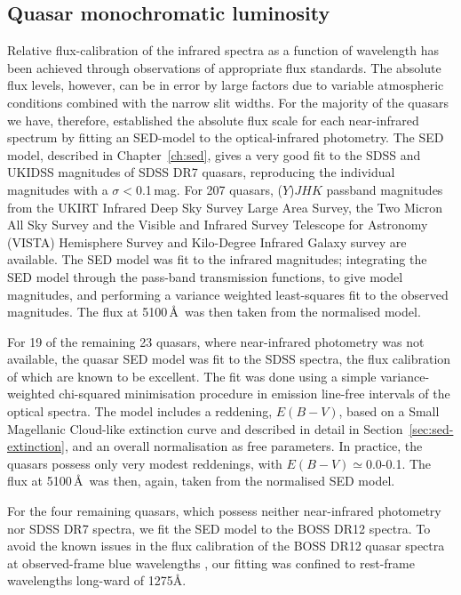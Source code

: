 \subsection{Quasar monochromatic luminosity}

Relative flux-calibration of the infrared spectra as a function of wavelength has been achieved through observations of appropriate flux standards. 
The absolute flux levels, however, can be in error by large factors due to variable atmospheric conditions combined with the narrow slit widths. 
For the majority of the quasars we have, therefore, established the absolute flux scale for each near-infrared spectrum by fitting an SED-model to the optical-infrared photometry. 
The SED model, described in Chapter~\ref{ch:sed}, gives a very good fit to the SDSS and UKIDSS magnitudes of SDSS DR7 quasars, reproducing the individual magnitudes with a $\sigma <$0.1\,mag. 
For 207 quasars, ($Y$)$JHK$ passband magnitudes from the UKIRT Infrared Deep Sky Survey \citep[UKIDSS;][]{lawrence07} Large Area Survey, the Two Micron All Sky Survey \citep[2MASS;][]{skrutskie06} and the Visible and Infrared Survey Telescope for Astronomy (VISTA) Hemisphere Survey \citep[VHS;][]{mcmahon13} and Kilo-Degree Infrared Galaxy \citep[VIKING;][]{edge13} survey are available. 
The SED model was fit to the infrared magnitudes; integrating the SED model through the pass-band transmission functions, to give model magnitudes, and performing a variance weighted least-squares fit to the observed magnitudes. 
The flux at 5100\,\AA\, was then taken from the normalised model.

For 19 of the remaining 23 quasars, where near-infrared photometry was not available, the quasar SED model was fit to the SDSS spectra, the flux calibration of which are known to be excellent.  
The fit was done using a simple variance-weighted chi-squared minimisation procedure in emission line-free intervals of the optical spectra.   
The model includes a reddening, $E(B-V)$, based on a Small Magellanic Cloud-like extinction curve and described in detail in Section~\ref{sec:sed-extinction}, and an overall normalisation as free parameters.
In practice, the quasars possess only very modest reddenings, with $E(B-V)\simeq$0.0-0.1.
The flux at 5100\,\AA\, was then, again, taken from the normalised SED model.

For the four remaining quasars, which possess neither near-infrared photometry nor SDSS DR7 spectra, we fit the SED model to the BOSS DR12 spectra. 
To avoid the known issues in the flux calibration of the BOSS DR12 quasar spectra at observed-frame blue wavelengths \citep{lee13}, our fitting was confined to rest-frame wavelengths long-ward of 1275\AA. 

